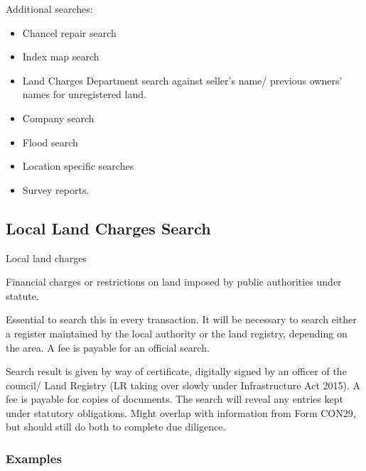 \documentclass[
]{article}
\providecommand{\tightlist}{%
  \setlength{\itemsep}{0pt}\setlength{\parskip}{0pt}}
\newenvironment{env-68b88379-d4cc-4b35-9b80-2115e064fa9f}
{
    \savenotes\tcolorbox[blanker,breakable,left=5pt,borderline west={2pt}{-4pt}{gold}]
}
{
    \endtcolorbox\spewnotes
}
\begin{document}
Additional searches:

\begin{itemize}
\tightlist
\item
  Chancel repair search
\item
  Index map search
\item
  Land Charges Department search against seller's name/ previous owners'
  names for unregistered land.
\item
  Company search
\item
  Flood search
\item
  Location specific searches
\item
  Survey reports.
\end{itemize}

\hypertarget{local-land-charges-search}{%
\subsection{Local Land Charges Search}\label{local-land-charges-search}}

\begin{env-68b88379-d4cc-4b35-9b80-2115e064fa9f}

Local land charges

Financial charges or restrictions on land imposed by public authorities
under statute.

\end{env-68b88379-d4cc-4b35-9b80-2115e064fa9f}

Essential to search this in every transaction. It will be necessary to
search either a register maintained by the local authority or the land
registry, depending on the area. A fee is payable for an official
search.

Search result is given by way of certificate, digitally signed by an
officer of the council/ Land Registry (LR taking over slowly under
Infrastructure Act 2015). A fee is payable for copies of documents. The
search will reveal any entries kept under statutory obligations. Might
overlap with information from Form CON29, but should still do both to
complete due diligence.

\hypertarget{examples}{%
\subsubsection{Examples}\label{examples}}
\end{document}
